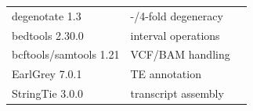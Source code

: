 \begin{table}[t]
\begin{tabularx}{\linewidth}{@{}l>{\raggedright\arraybackslash}Xl@{}}
    degenotate 1.3           & 0-/4-fold degeneracy                          & \citep{degenotate} \\
    bedtools 2.30.0          & interval operations                           & \citep{quinlan2010bedtools} \\
    bcftools/samtools 1.21   & VCF/BAM handling                              & \citep{danecek2021samtools} \\
    EarlGrey 7.0.1           & TE annotation                                 & \citep{baril2024earlgrey} \\
    StringTie 3.0.0          & transcript assembly                           & \citep{kovaka2019stringtie} \\
    \bottomrule
  \end{tabularx}
\end{table}

